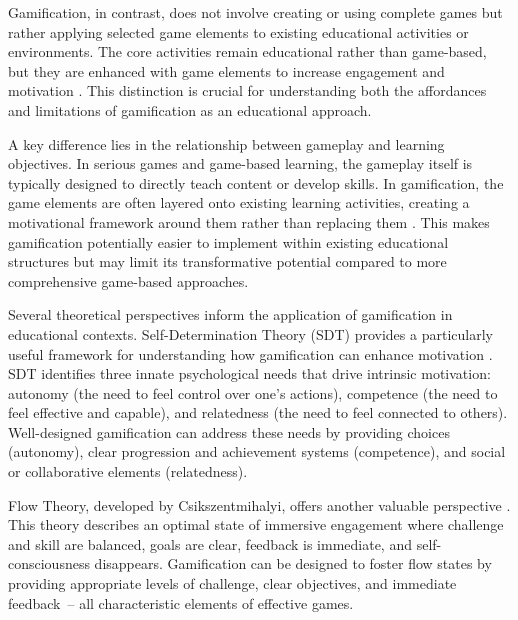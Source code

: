 \documentclass[cte]{acnsart}
\begin{document}
Gamification, in contrast, does not involve creating or using complete games but rather applying selected game elements to existing educational activities or environments. The core activities remain educational rather than game-based, but they are enhanced with game elements to increase engagement and motivation \cite{Humeniuk2022113}. This distinction is crucial for understanding both the affordances and limitations of gamification as an educational approach.

A key difference lies in the relationship between gameplay and learning objectives. In serious games and game-based learning, the gameplay itself is typically designed to directly teach content or develop skills. In gamification, the game elements are often layered onto existing learning activities, creating a motivational framework around them rather than replacing them \cite{Mitchell2024184}. This makes gamification potentially easier to implement within existing educational structures but may limit its transformative potential compared to more comprehensive game-based approaches.


Several theoretical perspectives inform the application of gamification in educational contexts. Self-Determination Theory (SDT) provides a particularly useful framework for understanding how gamification can enhance motivation \cite{Gupta2022341}. SDT identifies three innate psychological needs that drive intrinsic motivation: autonomy (the need to feel control over one's actions), competence (the need to feel effective and capable), and relatedness (the need to feel connected to others). Well-designed gamification can address these needs by providing choices (autonomy), clear progression and achievement systems (competence), and social or collaborative elements (relatedness).

Flow Theory, developed by Csikszentmihalyi, offers another valuable perspective \cite{Ho2024139}. This theory describes an optimal state of immersive engagement where challenge and skill are balanced, goals are clear, feedback is immediate, and self-consciousness disappears. Gamification can be designed to foster flow states by providing appropriate levels of challenge, clear objectives, and immediate feedback~-- all characteristic elements of effective games.
\end{document}
